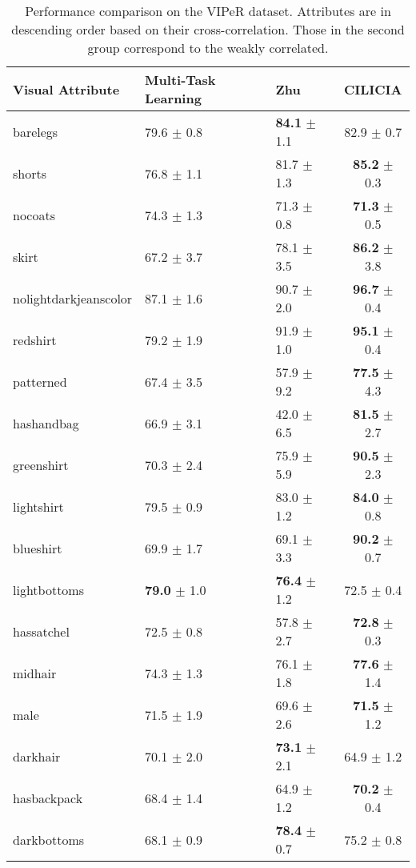 \documentclass[10pt,twocolumn,letterpaper]{article}
\begin{document}
	
	\begin{table}[t]
		\centering
		\caption{Performance comparison on the VIPeR dataset. Attributes are in descending order based on their cross-correlation. Those in the second group correspond to the weakly correlated.}
		\footnotesize    
		\begin{tabular}{p{2cm} P{1.8cm} P{1.7cm} c}
			\toprule
			Visual Attribute & Multi-Task Learning & Zhu \etal~\cite{zhu2015multi} & CILICIA\\
			\midrule
			barelegs & 79.6 $\pm$ 0.8 &  \textbf{84.1} $\pm$ 1.1 & 82.9 $\pm$ 0.7\\
			shorts& 76.8 $\pm$ 1.1 & 81.7 $\pm$ 1.3 & \textbf{85.2} $\pm$ 0.3\\
			nocoats& 74.3 $\pm$ 1.3 &71.3 $\pm$ 0.8 & \textbf{71.3} $\pm$ 0.5 \\
			skirt& 67.2 $\pm$ 3.7 & 78.1 $\pm$ 3.5 & \textbf{86.2} $\pm$ 3.8 \\
			nolightdarkjeanscolor& 87.1 $\pm$ 1.6 & 90.7 $\pm$ 2.0 & \textbf{96.7} $\pm$ 0.4\\
			redshirt& 79.2 $\pm$ 1.9 & 91.9 $\pm$ 1.0 & \textbf{95.1} $\pm$ 0.4 \\
			patterned& 67.4 $\pm$ 3.5 & 57.9 $\pm$ 9.2 & \textbf{77.5} $\pm$ 4.3 \\
			hashandbag& 66.9 $\pm$ 3.1 & 42.0 $\pm$ 6.5 & \textbf{81.5} $\pm$ 2.7\\
			greenshirt& 70.3 $\pm$ 2.4 & 75.9 $\pm$ 5.9 & \textbf{90.5} $\pm$  2.3\\
			lightshirt& 79.5 $\pm$ 0.9 & 83.0 $\pm$ 1.2 & \textbf{84.0} $\pm$ 0.8\\
			\midrule
			blueshirt& 69.9 $\pm$ 1.7 & 69.1 $\pm$ 3.3 & \textbf{90.2} $\pm$ 0.7 \\
			lightbottoms& \textbf{79.0} $\pm$ 1.0  & \textbf{76.4} $\pm$ 1.2 & 72.5 $\pm$ 0.4 \\
			hassatchel& 72.5 $\pm$ 0.8 & 57.8 $\pm$ 2.7 & \textbf{72.8} $\pm$ 0.3 \\
			midhair& 74.3 $\pm$ 1.3 & 76.1 $\pm$ 1.8 & \textbf{77.6} $\pm$ 1.4\\
			male& 71.5 $\pm$ 1.9 & 69.6 $\pm$ 2.6  & \textbf{71.5} $\pm$ 1.2\\
			darkhair& 70.1 $\pm$ 2.0 & \textbf{73.1} $\pm$ 2.1 & 64.9 $\pm$ 1.2\\            
			hasbackpack& 68.4 $\pm$ 1.4 &64.9 $\pm$ 1.2 & \textbf{70.2} $\pm$ 0.4\\
			darkbottoms& 68.1 $\pm$ 0.9  &\textbf{78.4} $\pm$ 0.7 & 75.2 $\pm$ 0.8\\

\end{tabular}
\end{table}
\end{document}
